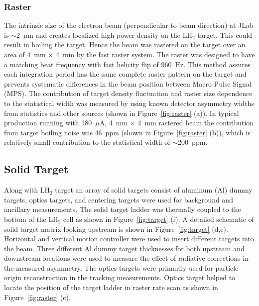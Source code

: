 \subsubsection{Raster}%
\label{Raster}

The intrinsic size of the electron beam (perpendicular to beam direction) at JLab is $\sim$2~$\mu$m and creates localized high power density on the LH$_{2}$ target. This could result in boiling the target. Hence the beam was rastered on the target over an area of 4~mm $\times$ 4~mm by the fast raster system.
The raster was designed to have a matching beat frequency with fast helicity flip of 960~Hz. This method assures each integration period has the same complete raster pattern on the target and prevents systematic differences in the beam position between Macro Pulse Signal (MPS). The contribution of target density fluctuation and raster size dependence to the statistical width was measured by using known detector asymmetry widths from statistics and other sources (shown in Figure~\ref{fig:raster} (a)). In typical production running with 180~$\mu$A, 4~mm $\times$ 4~mm rastered beam the contribution from target boiling noise was 46~ppm (shown in Figure~\ref{fig:raster} (b)), which is relatively small contribution to the statistical width of $\sim$200~ppm.

\subsection{Solid Target}%
\label{Solid Target}

Along with LH$_{2}$ target an array of solid targets \cite{greg_target_solid} consist of aluminum (Al) dummy targets, optics targets, and centering targets were used for background and ancillary measurements. The solid target ladder was thermally coupled to the bottom of the LH$_{2}$ cell as shown in Figure~\ref{fig:target} (f). A detailed schematic of solid target matrix looking upstream is shown in Figure~\ref{fig:target} (d,e). Horizontal and vertical motion controller were used to insert different targets into the beam. Three different Al dummy target thicknesses for both upstream and downstream locations were used to measure the effect of radiative corrections in the measured asymmetry. The optics targets were primarily used for particle origin reconstruction in the tracking measurements. Optics target helped to locate the position of the target ladder in raster rate scan as shown in Figure~\ref{fig:raster} (c). 

